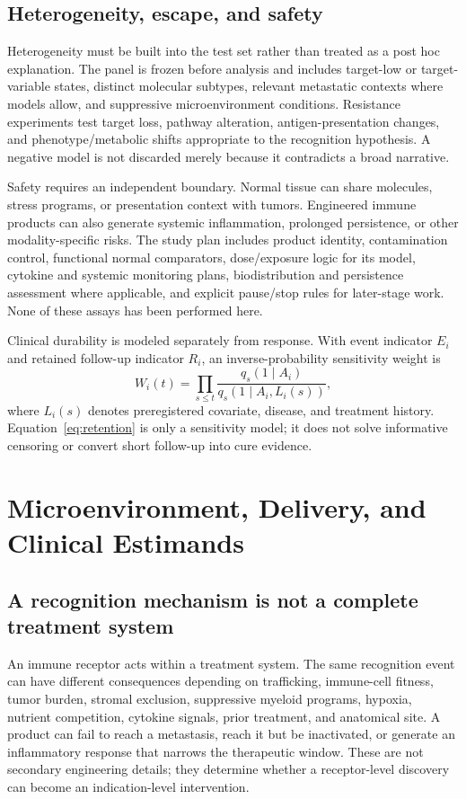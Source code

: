 \documentclass[10pt,conference]{IEEEtran}
\begin{document}
\subsection{Heterogeneity, escape, and safety}
Heterogeneity must be built into the test set rather than treated as a post hoc explanation. The panel is frozen before analysis and includes target-low or target-variable states, distinct molecular subtypes, relevant metastatic contexts where models allow, and suppressive microenvironment conditions. Resistance experiments test target loss, pathway alteration, antigen-presentation changes, and phenotype/metabolic shifts appropriate to the recognition hypothesis. A negative model is not discarded merely because it contradicts a broad narrative.

Safety requires an independent boundary. Normal tissue can share molecules, stress programs, or presentation context with tumors. Engineered immune products can also generate systemic inflammation, prolonged persistence, or other modality-specific risks. The study plan includes product identity, contamination control, functional normal comparators, dose/exposure logic for its model, cytokine and systemic monitoring plans, biodistribution and persistence assessment where applicable, and explicit pause/stop rules for later-stage work. None of these assays has been performed here.

Clinical durability is modeled separately from response. With event indicator $E_i$ and retained follow-up indicator $R_i$, an inverse-probability sensitivity weight is
\begin{equation}W_i(t)=\prod_{s\leq t}\frac{q_s(1\mid A_i)}{q_s(1\mid A_i,L_i(s))},\label{eq:retention}\end{equation}
where $L_i(s)$ denotes preregistered covariate, disease, and treatment history. Equation~\eqref{eq:retention} is only a sensitivity model; it does not solve informative censoring or convert short follow-up into cure evidence.

\section{Microenvironment, Delivery, and Clinical Estimands}\label{sec:clinical}
\subsection{A recognition mechanism is not a complete treatment system}
An immune receptor acts within a treatment system. The same recognition event can have different consequences depending on trafficking, immune-cell fitness, tumor burden, stromal exclusion, suppressive myeloid programs, hypoxia, nutrient competition, cytokine signals, prior treatment, and anatomical site. A product can fail to reach a metastasis, reach it but be inactivated, or generate an inflammatory response that narrows the therapeutic window. These are not secondary engineering details; they determine whether a receptor-level discovery can become an indication-level intervention.
\end{document}
